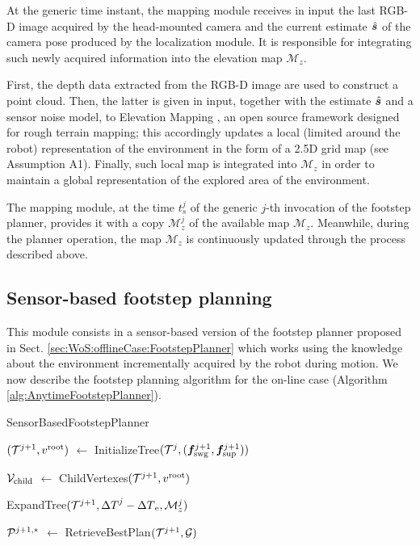 At the generic time instant, the mapping module receives in input the last RGB-D image acquired by the head-mounted camera and the current estimate $\hat{{\bm{s}}}$ of the camera pose produced by the localization module. 
It is responsible for integrating such newly acquired information into the elevation map
$\mathcal{M}_z$.

First, the depth data extracted from the RGB-D image are used to construct a point cloud.
Then, the latter is given in input, together with the estimate $\hat{{\bm{s}}}$ and a sensor noise model, to Elevation Mapping \cite{FaBlHu:18}, an open source framework designed for rough terrain mapping; this accordingly updates a local (limited around the robot)
representation of the environment in the form of a 2.5D grid map (see Assumption A1).
Finally, such local map is integrated into $\mathcal{M}_z$ in order to maintain a global representation of the explored area of the environment.

The mapping module, at the time $t_s^j$ of the generic $j$-th invocation of the footstep planner, provides it with a copy $\mathcal{M}_z^j$ of the available map $\mathcal{M}_z$.
Meanwhile, during the planner operation, the map $\mathcal{M}_z$ is continuously updated through the process described above.

\subsection{Sensor-based footstep planning}
\label{sec:WoS:onlineCase:FootstepPlanner}

This module consists in a sensor-based version of the footstep planner proposed in Sect. \ref{sec:WoS:offlineCase:FootstepPlanner} which works using the knowledge about the environment incrementally acquired by the robot during motion. 
We now describe the footstep planning algorithm for the on-line case (Algorithm \ref{alg:AnytimeFootstepPlanner}).

\begin{algorithm}%
	\small
	\removelatexerror
	
	\caption{SensorBasedFootstepPlanner}
	\label{alg:AnytimeFootstepPlanner}

	\vspace{2pt}
    \BlankLine

    $({\cal T}^{j+1}, v^{\rm root})$ $\leftarrow$ InitializeTree$({\cal T}^j, ({{\bm{f}}}_{\rm swg}^{j+1}, {{\bm{f}}}_{\rm sup}^{j+1}))$\; 
	
    ${\cal V}_{\rm child}$ $\leftarrow$ ChildVertexes$({\cal T}^{j+1}, v^{\rm root})$\;

	ExpandTree$({\cal T}^{j+1}, {\Delta T}^j - {\Delta T}_{\rm e}, {\cal M}_z^j)$\;

	${\cal P}^{j+1,*}$ $\leftarrow$ RetrieveBestPlan$({\cal T}^{j+1}, {\cal G})$\;
    \;
\end{algorithm}

